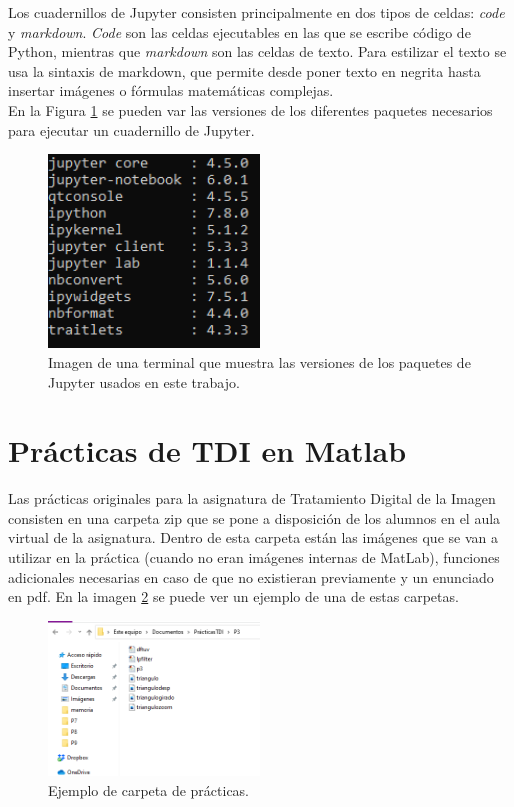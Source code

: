 \documentclass[a4paper,12pt]{report}
\begin{document}
Los cuadernillos de Jupyter consisten principalmente en dos tipos de celdas: \emph{code} y \emph{markdown}.\emph{ Code }son las celdas ejecutables en las que se escribe código de Python, mientras que \emph{markdown} son las celdas de texto. Para estilizar el texto se usa  la sintaxis de markdown, que permite desde poner texto en negrita hasta insertar imágenes o fórmulas matemáticas complejas.\\

En la Figura \ref{versionjupyter} se pueden var las versiones de los diferentes paquetes necesarios para ejecutar un cuadernillo de Jupyter.

\begin{figure}[h]
\centering
\includegraphics[width=0.5\textwidth]{imagenes/versionjupyter}
\caption{Imagen de una terminal que muestra las versiones de los paquetes de Jupyter usados en este trabajo.}
\label{versionjupyter}
\end{figure}


\section{Prácticas de TDI en Matlab}


Las prácticas originales para la asignatura de Tratamiento Digital de la Imagen consisten en una carpeta zip que se pone a disposición de los alumnos en el aula virtual de la asignatura. Dentro de esta carpeta están las imágenes que se van a utilizar en la práctica (cuando no eran imágenes internas de MatLab), funciones adicionales necesarias en caso de que no existieran previamente y un enunciado en pdf. En la imagen \ref{carpetapracticas} se puede ver un ejemplo de una de estas carpetas.
 
\begin{figure}[h]
\centering
\includegraphics[width=0.5\textwidth]{imagenes/carpetapracticas}
\caption{Ejemplo de carpeta de prácticas.}
\label{carpetapracticas}
\end{figure}
\end{document}
